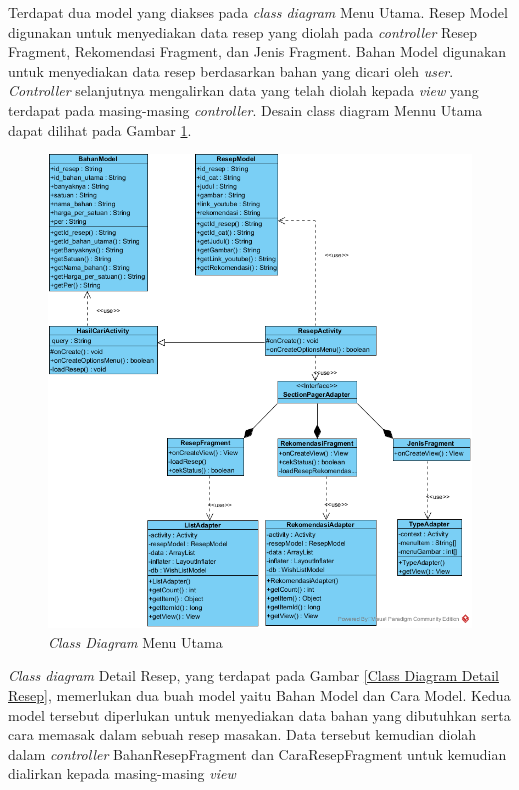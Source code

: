 		Terdapat dua model yang diakses pada \textit{class diagram} Menu Utama. Resep Model digunakan untuk menyediakan data resep yang diolah pada \textit{controller} Resep Fragment, Rekomendasi Fragment, dan Jenis Fragment. Bahan Model digunakan untuk menyediakan data resep berdasarkan bahan yang dicari oleh \textit{user}.  \textit{Controller} selanjutnya mengalirkan data yang telah diolah kepada \textit{view} yang terdapat pada masing-masing \textit{controller}. Desain class diagram Mennu Utama dapat dilihat pada Gambar \ref{Class Diagram1}.  

		\begin{figure}[H]
			\centering
			\includegraphics[origin=c,width=1\textwidth]{gambar/class/MenuUtama}
			\caption{\emph{Class Diagram} Menu Utama}
			\label{Class Diagram1}
		\end{figure}
		
		\textit{Class diagram} Detail Resep, yang terdapat pada Gambar \ref{Class Diagram Detail Resep}, memerlukan dua buah model yaitu Bahan Model dan Cara Model. Kedua model tersebut diperlukan untuk menyediakan data bahan yang dibutuhkan serta cara memasak dalam sebuah resep masakan. Data tersebut kemudian diolah dalam \textit{controller} BahanResepFragment dan CaraResepFragment untuk kemudian dialirkan kepada masing-masing \textit{view}
		
